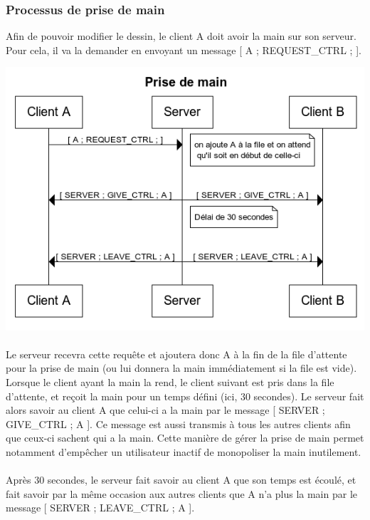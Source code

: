 \documentclass[a4paper,11pt]{article}
\begin{document}
\subsubsection{Processus de prise de main}
Afin de pouvoir modifier le dessin, le client A doit avoir la main sur son serveur. Pour cela, il va la demander en envoyant un message [ A ; REQUEST\_CTRL ; ].

\begin{center}
\includegraphics[scale=0.8]{image/Prise_de_main.png}
\end{center}

\paragraph{} Le serveur recevra cette requête et ajoutera donc A à la fin de la file d'attente pour la prise de main (ou lui donnera la main immédiatement si la file est vide). Lorsque le client ayant la main la rend, le client suivant est pris dans la file d'attente, et reçoit la main pour un temps défini (ici, 30 secondes). Le serveur fait alors savoir au client A que celui-ci a la main par le message [ SERVER ; GIVE\_CTRL ; A ]. Ce message est aussi transmis à tous les autres clients afin que ceux-ci sachent qui a la main. Cette manière de gérer la prise de main permet notamment d'empêcher un utilisateur inactif de monopoliser la main inutilement. 

\paragraph{} Après 30 secondes, le serveur fait savoir au client A que son temps est écoulé, et fait savoir par la même occasion aux autres clients que A n'a plus la main par le message [ SERVER ; LEAVE\_CTRL ; A ].
\end{document}
